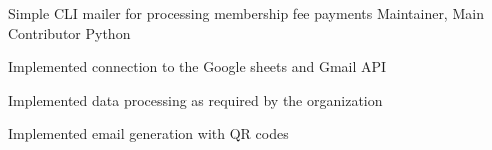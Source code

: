 \begin{cventries}
  \cventry
    {Simple CLI mailer for processing membership fee payments} %
    {} %
    {Maintainer, Main Contributor} %
    {Python} %
    {
      \begin{cvitems} %
        \item {Implemented connection to the Google sheets and Gmail API}
        \item {Implemented data processing as required by the organization}
        \item {Implemented email generation with QR codes}
      \end{cvitems}
    }


\end{cventries}
    




